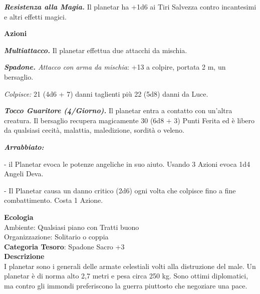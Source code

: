 \begin{multicols}{2}
{\emph{\textbf{Resistenza alla Magia.}} Il planetar ha +1d6 ai Tiri Salvezza contro incantesimi e altri effetti magici.

\textbf{Azioni}

\emph{\textbf{Multiattacco.}} Il planetar effettua due attacchi da mischia.

\emph{\textbf{Spadone.} Attacco con arma da mischia}: +13 a colpire, portata 2 m, un bersaglio.

\emph{Colpisce:} 21 (4d6 + 7) danni taglienti più 22 (5d8) danni da Luce.

\emph{\textbf{Tocco Guaritore (4/Giorno).}} Il planetar entra a contatto con un'altra creatura. Il bersaglio recupera magicamente 30 (6d8 + 3) Punti Ferita ed è libero da qualsiasi cecità, malattia, maledizione, sordità o veleno.

\emph{\textbf{Arrabbiato:}}

- il Planetar evoca le potenze angeliche in suo aiuto. Usando 3 Azioni evoca 1d4 Angeli Deva.

- Il Planetar causa un danno critico (2d6) ogni volta che colpisce fino a fine combattimento. Costa 1 Azione.

\textbf{Ecologia}\\
Ambiente: Qualsiasi piano con Tratti buono\\
Organizzazione: Solitario o coppia\\
\textbf{Categoria Tesoro}: Spadone Sacro +3\\
\textbf{Descrizione}\\
I planetar sono i generali delle armate celestiali volti alla distruzione del male. Un planetar è di norma alto 2,7 metri e pesa circa 250 kg. Sono ottimi diplomatici, ma contro gli immondi preferiscono la guerra piuttosto che negoziare una pace.

}
\end{multicols}
